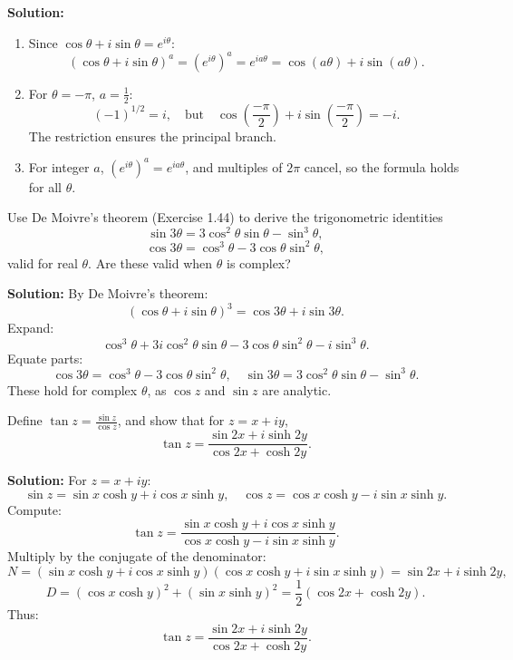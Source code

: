 \textbf{Solution:}
\begin{enumerate}[label=\roman*)]
\item Since \( \cos \theta + i \sin \theta = e^{i\theta} \):
\[
(\cos \theta + i \sin \theta)^a = (e^{i\theta})^a = e^{i a \theta} = \cos(a\theta) + i \sin(a\theta).
\]
\item For \( \theta = -\pi \), \( a = \frac{1}{2} \):
\[
(-1)^{1/2} = i, \quad \text{but} \quad \cos\left(\frac{-\pi}{2}\right) + i \sin\left(\frac{-\pi}{2}\right) = -i.
\]
The restriction ensures the principal branch.
\item For integer \( a \), \( (e^{i\theta})^a = e^{i a \theta} \), and multiples of \( 2\pi \) cancel, so the formula holds for all \( \theta \).
\end{enumerate}

\begin{problembox}
Use De Moivre’s theorem (Exercise 1.44) to derive the trigonometric identities
\[
\sin 3\theta = 3 \cos^2 \theta \sin \theta - \sin^3 \theta,
\]
\[
\cos 3\theta = \cos^3 \theta - 3 \cos \theta \sin^2 \theta,
\]
valid for real \( \theta \). Are these valid when \( \theta \) is complex?
\end{problembox}

\textbf{Solution:}
By De Moivre’s theorem:
\[
(\cos \theta + i \sin \theta)^3 = \cos 3\theta + i \sin 3\theta.
\]
Expand:
\[
\cos^3 \theta + 3i \cos^2 \theta \sin \theta - 3 \cos \theta \sin^2 \theta - i \sin^3 \theta.
\]
Equate parts:
\[
\cos 3\theta = \cos^3 \theta - 3 \cos \theta \sin^2 \theta, \quad \sin 3\theta = 3 \cos^2 \theta \sin \theta - \sin^3 \theta.
\]
These hold for complex \( \theta \), as \( \cos z \) and \( \sin z \) are analytic.

\begin{problembox}
Define \( \tan z = \frac{\sin z}{\cos z} \), and show that for \( z = x + iy \),
\[
\tan z = \frac{\sin 2x + i \sinh 2y}{\cos 2x + \cosh 2y}.
\]
\end{problembox}

\textbf{Solution:}
For \( z = x + iy \):
\[
\sin z = \sin x \cosh y + i \cos x \sinh y, \quad \cos z = \cos x \cosh y - i \sin x \sinh y.
\]
Compute:
\[
\tan z = \frac{\sin x \cosh y + i \cos x \sinh y}{\cos x \cosh y - i \sin x \sinh y}.
\]
Multiply by the conjugate of the denominator:
\[
N = (\sin x \cosh y + i \cos x \sinh y)(\cos x \cosh y + i \sin x \sinh y) = \sin 2x + i \sinh 2y,
\]
\[
D = (\cos x \cosh y)^2 + (\sin x \sinh y)^2 = \frac{1}{2}(\cos 2x + \cosh 2y).
\]
Thus:
\[
\tan z = \frac{\sin 2x + i \sinh 2y}{\cos 2x + \cosh 2y}.
\]

